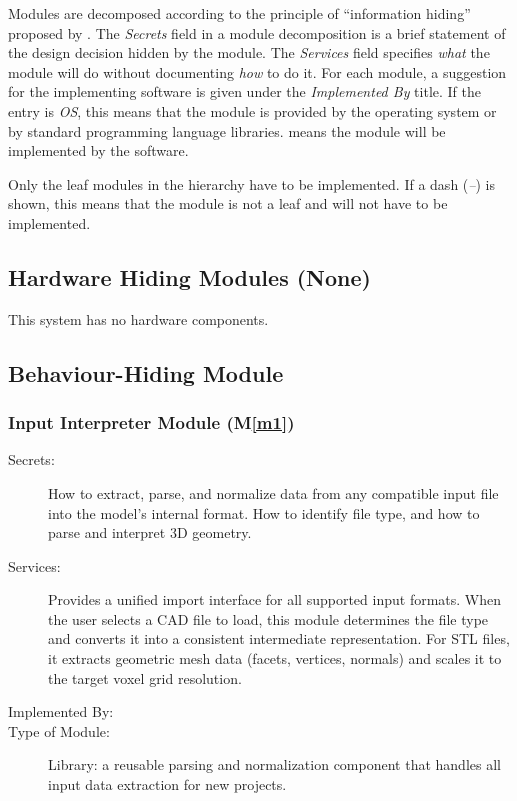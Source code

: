 \documentclass[12pt, titlepage]{article}
\newcommand{\mref}[1]{M\ref{#1}}
\begin{document}
Modules are decomposed according to the principle of ``information hiding''
proposed by \citet{ParnasEtAl1984}. The \emph{Secrets} field in a module
decomposition is a brief statement of the design decision hidden by the
module. The \emph{Services} field specifies \emph{what} the module will do
without documenting \emph{how} to do it. For each module, a suggestion for the
implementing software is given under the \emph{Implemented By} title. If the
entry is \emph{OS}, this means that the module is provided by the operating
system or by standard programming language libraries.  \emph{\progname{}} means the
module will be implemented by the \progname{} software.

Only the leaf modules in the hierarchy have to be implemented. If a dash
(\emph{--}) is shown, this means that the module is not a leaf and will not have
to be implemented.

\subsection{Hardware Hiding Modules (None)}

This system has no hardware components.

\subsection{Behaviour-Hiding Module}

\subsubsection{Input Interpreter Module (\mref{m1})}

\begin{description}
\item[Secrets:] How to extract, parse, and normalize data from any compatible input file into the model’s internal format. How to identify file type, and how to parse and interpret 3D geometry.
\item[Services:] Provides a unified import interface for all supported input formats. When the user selects a CAD file to load, this module determines the file type and converts it into a consistent intermediate representation. For STL files, it extracts geometric mesh data (facets, vertices, normals) and scales it to the target voxel grid resolution.
\item[Implemented By:] \progname{}
\item[Type of Module:] Library: a reusable parsing and normalization component that handles all input data extraction for new projects.
\end{description}
\end{document}
